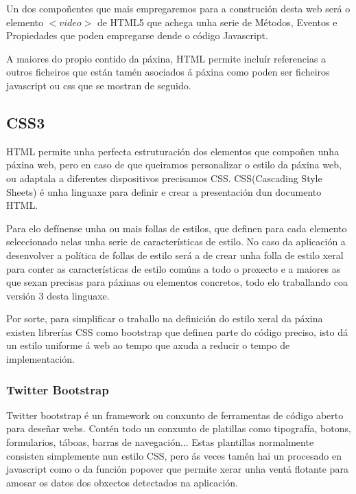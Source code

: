         Un dos compoñentes que mais empregaremos para a construción desta web será o elemento 
        $<video>$ de HTML5 que achega unha serie de Métodos, Eventos e Propiedades
        \cite{w3school-video-events} que poden empregarse dende o código Javascript.
        
        A maiores do propio contido da páxina, HTML permite incluír referencias a outros ficheiros que 
        están tamén asociados á páxina como poden ser ficheiros javascript ou css que se mostran de 
        seguido.
    
    \subsection{CSS3}
        HTML permite unha perfecta estruturación dos elementos que compoñen unha páxina web, pero 
        en caso de que queiramos personalizar o estilo da páxina web, ou adaptala a diferentes 
        dispositivos precisamos CSS. CSS(Cascading Style Sheets) é unha linguaxe para definir e 
        crear a presentación dun documento HTML.
        
        Para elo defínense unha ou mais follas de estilos, que definen para cada elemento 
        seleccionado nelas unha serie de características de estilo. No caso da aplicación a 
        desenvolver a política de follas de estilo será a de crear unha folla de estilo xeral para 
        conter as características de estilo comúns a todo o proxecto e a maiores as que sexan 
        precisas para páxinas ou elementos concretos, todo elo traballando coa versión 3 desta linguaxe.
    
        Por sorte, para simplificar o traballo na definición do estilo xeral da páxina existen 
        librerías CSS como bootstrap que definen parte do código preciso, isto dá un estilo 
        uniforme á web ao tempo que axuda a reducir o tempo de implementación.
        
        \subsubsection{Twitter Bootstrap}
            Twitter bootstrap é un framework ou conxunto de ferramentas de código aberto para 
            deseñar webs. Contén todo un conxunto de platillas como tipografía, botons, formularios,
            táboas, barras de navegación... Estas plantillas normalmente consisten simplemente nun
            estilo CSS, pero ás veces tamén hai un procesado en javascript como o da función popover
            que permite xerar unha ventá flotante para amosar os datos dos obxectos detectados na 
            aplicación.
            
